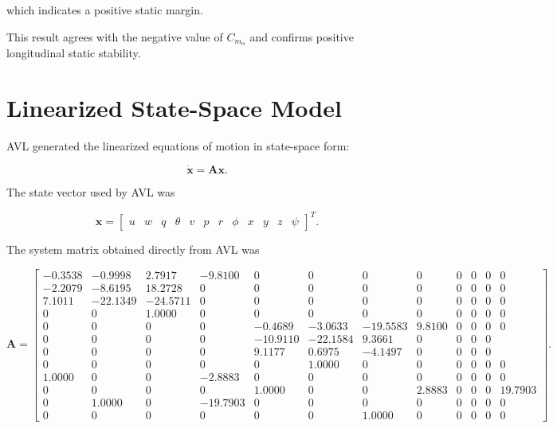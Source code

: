 \documentclass[11pt,a4paper]{article}
\begin{document}
which indicates a positive static margin.

This result agrees with the negative value of $C_{m_\alpha}$ and confirms
positive longitudinal static stability.

\section{Linearized State-Space Model}

AVL generated the linearized equations of motion in state-space form:

\begin{equation}
\dot{\mathbf{x}}=\mathbf{A}\mathbf{x}.
\end{equation}

The state vector used by AVL was

\begin{equation}
\mathbf{x}
=
\begin{bmatrix}
u & w & q & \theta &
v & p & r & \phi &
x & y & z & \psi
\end{bmatrix}^{T}.
\end{equation}

The system matrix obtained directly from AVL was

\begin{equation}
\mathbf{A}
=
\begin{bmatrix}
-0.3538 & -0.9998 & 2.7917 & -9.8100 & 0 & 0 & 0 & 0 & 0 & 0 & 0 & 0\\
-2.2079 & -8.6195 & 18.2728 & 0 & 0 & 0 & 0 & 0 & 0 & 0 & 0 & 0\\
7.1011 & -22.1349 & -24.5711 & 0 & 0 & 0 & 0 & 0 & 0 & 0 & 0 & 0\\
0 & 0 & 1.0000 & 0 & 0 & 0 & 0 & 0 & 0 & 0 & 0 & 0\\
0 & 0 & 0 & 0 & -0.4689 & -3.0633 & -19.5583 & 9.8100 & 0 & 0 & 0 & 0\\
0 & 0 & 0 & 0 & -10.9110 & -22.1584 & 9.3661 & 0 & 0 & 0 & 0\\
0 & 0 & 0 & 0 & 9.1177 & 0.6975 & -4.1497 & 0 & 0 & 0 & 0\\
0 & 0 & 0 & 0 & 0 & 1.0000 & 0 & 0 & 0 & 0 & 0 & 0\\
1.0000 & 0 & 0 & -2.8883 & 0 & 0 & 0 & 0 & 0 & 0 & 0 & 0\\
0 & 0 & 0 & 0 & 1.0000 & 0 & 0 & 2.8883 & 0 & 0 & 0 & 19.7903\\
0 & 1.0000 & 0 & -19.7903 & 0 & 0 & 0 & 0 & 0 & 0 & 0 & 0\\
0 & 0 & 0 & 0 & 0 & 0 & 1.0000 & 0 & 0 & 0 & 0 & 0
\end{bmatrix}.
\end{equation}
\end{document}
